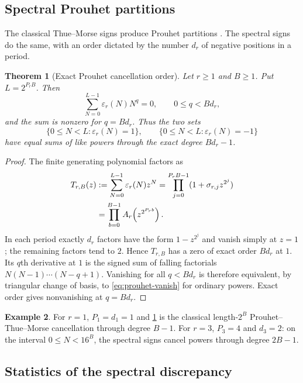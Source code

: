 \documentclass[11pt,a4paper]{article}
\theoremstyle{frontier}
\newtheorem{theorem}{Theorem}[section]
\theoremstyle{definition}
\newtheorem{example}[theorem]{Example}
\begin{document}
\subsection{Spectral Prouhet partitions}

The classical Thue--Morse signs produce Prouhet partitions \cite{allouche-shallit-1999,automatic-sequences}.  The spectral signs do the same, with an order dictated by the number $d_r$ of negative positions in a period.

\begin{theorem}[Exact Prouhet cancellation order]\label{thm:prouhet-r}
Let $r\ge1$ and $B\ge1$.  Put $L=2^{P_rB}$.  Then
\begin{equation}\label{eq:prouhet-vanish}
 \sum_{N=0}^{L-1}\varepsilon_r(N)N^q=0,
 \qquad 0\le q<Bd_r,
\end{equation}
and the sum is nonzero for $q=Bd_r$.  Thus the two sets
\[
 \{0\le N<L:\varepsilon_r(N)=1\},
 \qquad
 \{0\le N<L:\varepsilon_r(N)=-1\}
\]
have equal sums of like powers through the exact degree $Bd_r-1$.
\end{theorem}

\begin{proof}
The finite generating polynomial factors as
\begin{align}
 T_{r,B}(z)
 &:=\sum_{N=0}^{L-1}\varepsilon_r(N)z^N
 =\prod_{j=0}^{P_rB-1}(1+\sigma_{r,j}z^{2^j})\notag\\
 &=\prod_{b=0}^{B-1}A_r\!\left(z^{2^{P_rb}}\right).\label{eq:finite-prouhet-product}
\end{align}
In each period exactly $d_r$ factors have the form $1-z^{2^j}$ and vanish simply at $z=1$; the remaining factors tend to $2$.  Hence $T_{r,B}$ has a zero of exact order $Bd_r$ at $1$.  Its $q$th derivative at $1$ is the signed sum of falling factorials $N(N-1)\cdots(N-q+1)$.  Vanishing for all $q<Bd_r$ is therefore equivalent, by triangular change of basis, to \eqref{eq:prouhet-vanish} for ordinary powers.  Exact order gives nonvanishing at $q=Bd_r$.
\end{proof}

\begin{example}
For $r=1$, $P_1=d_1=1$ and \cref{thm:prouhet-r} is the classical length-$2^B$ Prouhet--Thue--Morse cancellation through degree $B-1$.  For $r=3$, $P_3=4$ and $d_3=2$: on the interval $0\le N<16^B$, the spectral signs cancel powers through degree $2B-1$.
\end{example}

\subsection{Statistics of the spectral discrepancy}
\end{document}
